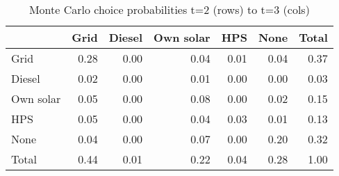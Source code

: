 \begin{table}[!ht]
	\centering
		\caption{Monte Carlo choice probabilities t=2 (rows) to t=3 (cols)}
\begin{tabular}{lrrrrrr}
		\toprule
               &      Grid&    Diesel& Own solar&       HPS&      None&     Total\\
		\midrule
		           Grid&      0.28&      0.00&      0.04&      0.01&      0.04&      0.37\\
		         Diesel&      0.02&      0.00&      0.01&      0.00&      0.00&      0.03\\
		      Own solar&      0.05&      0.00&      0.08&      0.00&      0.02&      0.15\\
		            HPS&      0.05&      0.00&      0.04&      0.03&      0.01&      0.13\\
		           None&      0.04&      0.00&      0.07&      0.00&      0.20&      0.32\\
		          Total&      0.44&      0.01&      0.22&      0.04&      0.28&      1.00\\
		\bottomrule
	\end{tabular}
\end{table}
